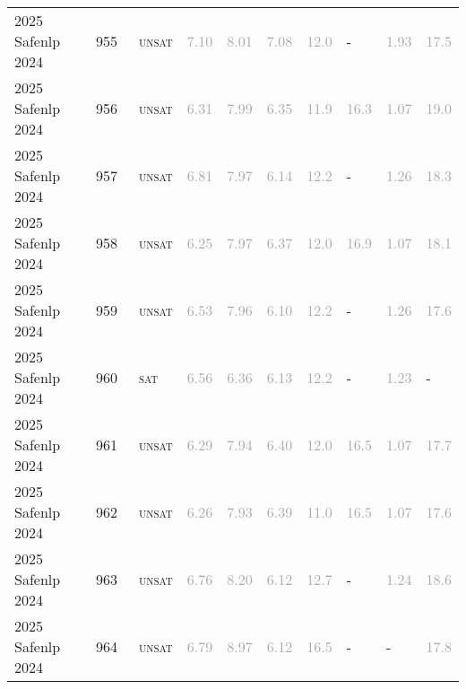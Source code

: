 \begin{center}
{\begin{longtable}{@{}llllllllll@{}}
2025 Safenlp 2024 & 955 & ~\textsc{unsat} & \textcolor{darkgray}{7.10} & \textcolor{darkgray}{8.01} & \textcolor{darkgray}{7.08} & \textcolor{darkgray}{12.0} & - & \textcolor{darkgray}{1.93} & \textcolor{darkgray}{17.5} \\
2025 Safenlp 2024 & 956 & ~\textsc{unsat} & \textcolor{darkgray}{6.31} & \textcolor{darkgray}{7.99} & \textcolor{darkgray}{6.35} & \textcolor{darkgray}{11.9} & \textcolor{darkgray}{16.3} & \textcolor{darkgray}{1.07} & \textcolor{darkgray}{19.0} \\
2025 Safenlp 2024 & 957 & ~\textsc{unsat} & \textcolor{darkgray}{6.81} & \textcolor{darkgray}{7.97} & \textcolor{darkgray}{6.14} & \textcolor{darkgray}{12.2} & - & \textcolor{darkgray}{1.26} & \textcolor{darkgray}{18.3} \\
2025 Safenlp 2024 & 958 & ~\textsc{unsat} & \textcolor{darkgray}{6.25} & \textcolor{darkgray}{7.97} & \textcolor{darkgray}{6.37} & \textcolor{darkgray}{12.0} & \textcolor{darkgray}{16.9} & \textcolor{darkgray}{1.07} & \textcolor{darkgray}{18.1} \\
2025 Safenlp 2024 & 959 & ~\textsc{unsat} & \textcolor{darkgray}{6.53} & \textcolor{darkgray}{7.96} & \textcolor{darkgray}{6.10} & \textcolor{darkgray}{12.2} & - & \textcolor{darkgray}{1.26} & \textcolor{darkgray}{17.6} \\
2025 Safenlp 2024 & 960 & ~\textsc{sat} & \textcolor{darkgray}{6.56} & \textcolor{darkgray}{6.36} & \textcolor{darkgray}{6.13} & \textcolor{darkgray}{12.2} & - & \textcolor{darkgray}{1.23} & - \\
2025 Safenlp 2024 & 961 & ~\textsc{unsat} & \textcolor{darkgray}{6.29} & \textcolor{darkgray}{7.94} & \textcolor{darkgray}{6.40} & \textcolor{darkgray}{12.0} & \textcolor{darkgray}{16.5} & \textcolor{darkgray}{1.07} & \textcolor{darkgray}{17.7} \\
2025 Safenlp 2024 & 962 & ~\textsc{unsat} & \textcolor{darkgray}{6.26} & \textcolor{darkgray}{7.93} & \textcolor{darkgray}{6.39} & \textcolor{darkgray}{11.0} & \textcolor{darkgray}{16.5} & \textcolor{darkgray}{1.07} & \textcolor{darkgray}{17.6} \\
2025 Safenlp 2024 & 963 & ~\textsc{unsat} & \textcolor{darkgray}{6.76} & \textcolor{darkgray}{8.20} & \textcolor{darkgray}{6.12} & \textcolor{darkgray}{12.7} & - & \textcolor{darkgray}{1.24} & \textcolor{darkgray}{18.6} \\
2025 Safenlp 2024 & 964 & ~\textsc{unsat} & \textcolor{darkgray}{6.79} & \textcolor{darkgray}{8.97} & \textcolor{darkgray}{6.12} & \textcolor{darkgray}{16.5} & - & - & \textcolor{darkgray}{17.8} \\

\end{longtable}}
\end{center}
